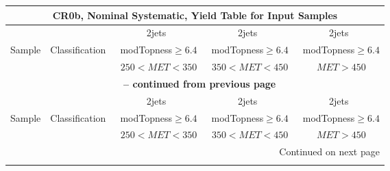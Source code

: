 \documentclass{article}
\begin{document}
\begin{longtable}{|l|c|c|c|c|} 
 
\multicolumn{5}{c}{ CR0b, Nominal Systematic, Yield Table for Input Samples }\\* \hline 
 &  & 2jets  & 2jets  & 2jets \\* 
Sample & Classification  & ~modTopness$\ge6.4$  & ~modTopness$\ge6.4$  & ~modTopness$\ge6.4$ \\* 
 &  & ~$250<MET<350$  & ~$350<MET<450$  & ~$MET>450$ \\* 
\hline \hline 
\endfirsthead 
 
\multicolumn{5}{c}{{\bfseries \tablename\ \thetable{} -- continued from previous page}}\\* \hline 
 &  & 2jets  & 2jets  & 2jets \\* 
Sample & Classification  & ~modTopness$\ge6.4$  & ~modTopness$\ge6.4$  & ~modTopness$\ge6.4$ \\* 
 &  & ~$250<MET<350$  & ~$350<MET<450$  & ~$MET>450$ \\* 
\hline \hline 
\endhead 
 
\multicolumn{5}{|r|}{{Continued on next page}}\\* \hline 
\endfoot 
 
 
\endlastfoot 
 

\end{longtable}
\end{document}
